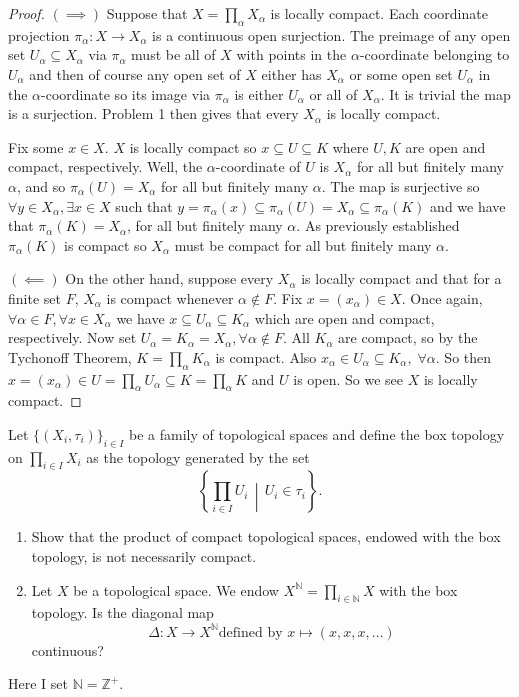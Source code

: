 \documentclass[addpoints,10pt]{exam}
\theoremstyle{plain}
\theoremstyle{definition}
\newtheorem{prob}[thm]{Problem}
\theoremstyle{plain}
\theoremstyle{definition}
\let\oldprob\prob
\let\endoldprob\endprob
\renewenvironment{prob}
  {\begin{singlespace}\oldprob}
  {\endoldprob\end{singlespace}}
\newcommand{\NN}{\ensuremath{\mathbb{N}}}
\newcommand{\ZZ}{\ensuremath{\mathbb{Z}}}
\begin{document}
\begin{proof}
$(\implies)$ Suppose that $X=\prod_{\alpha}X_{\alpha}$ is locally compact. Each
coordinate projection $\pi_{\alpha}\colon X\to X_{\alpha}$ is a continuous open surjection. The preimage of any open set $U_{\alpha}\subseteq X_{\alpha}$ via $\pi_{\alpha}$ must be all of $X$ with points in the $\alpha$-coordinate belonging to $U_{\alpha}$ and then of course any open set of $X$ either has $X_{\alpha}$ or some open set $U_{\alpha}$ in the $\alpha$-coordinate so its image via $\pi_{\alpha}$ is either $U_{\alpha}$ or all of $X_{\alpha}$. It is trivial the map is a surjection. Problem 1 then gives that every $X_{\alpha}$ is locally
compact.

Fix some $x\in X$. $X$ is locally compact so $x\subseteq U\subseteq K$ where $U,K$ are open and compact, respectively. Well, the $\alpha$-coordinate of $U$ is $X_{\alpha}$ for all but finitely many $\alpha$, and so $\pi_{\alpha}(U)=X_{\alpha}$ for all but finitely many $\alpha$. The map is surjective so $\forall y\in X_{\alpha}, \exists x\in X$ such that $y=\pi_{\alpha}(x)\subseteq \pi_{\alpha}(U)=X_{\alpha}\subseteq \pi_{\alpha}(K)$ and we have that $\pi_{\alpha}(K)=X_{\alpha}$, for all but finitely many $\alpha$. As previously established $\pi_{\alpha}(K)$ is compact so $X_{\alpha}$ must be compact for all but finitely many $\alpha$. 

$(\impliedby)$ On the other hand, suppose every $X_{\alpha}$ is locally compact and that for a finite set $F$, $X_{\alpha}$ is compact whenever
$\alpha\notin F$. Fix $x=(x_{\alpha})\in X$. Once again, $\forall \alpha\in F,\forall x\in X_{\alpha}$ we have $x\subseteq U_{\alpha}\subseteq K_{\alpha}$ which are open and compact, respectively. Now set $U_{\alpha}=K_{\alpha}=X_{\alpha},\forall \alpha\notin F.$ All $K_{\alpha}$ are compact, so by the Tychonoff Theorem,
$K=\prod_{\alpha}K_{\alpha}$ is compact. Also $x_{\alpha}\in U_{\alpha}\subseteq K_{\alpha},\;\forall \alpha$. So then $x=(x_{\alpha})\in U=\prod_{\alpha}U_{\alpha}\subseteq K=\prod_{\alpha} K$ and $U$ is open. So we see $X$ is locally compact.

\end{proof}
\newpage

\begin{prob}
Let $\{(X_i,\tau_i)\}_{i\in I}$ be a family of topological spaces and define
the box topology on $\prod_{i\in I}X_i$ as the topology generated by the set
\[
\left\{\prod_{i\in I}U_i\,\middle|\,U_i\in\tau_i\right\}.
\]
\begin{enumerate}[label=(\alph*)]
    \item Show that the product of compact topological spaces, endowed with
    the box topology, is not necessarily compact.
    \item Let $X$ be a topological space. We endow
    $X^{\NN}=\prod_{i\in\NN}X$ with the box topology. Is the diagonal map
    \[
    \Delta:X\longrightarrow X^{\NN}\text{defined by }
    x\longmapsto (x,x,x,\ldots)
    \]
    continuous?
\end{enumerate}
Here I set $\NN=\ZZ^{+}.$
\end{prob}
\end{document}
